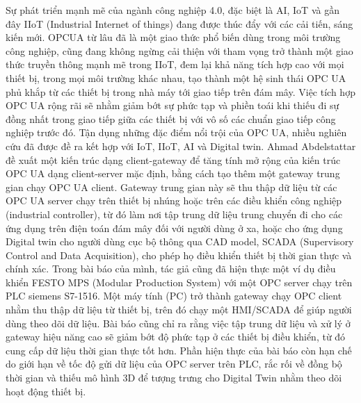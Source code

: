 Sự phát triển mạnh mẽ của ngành công nghiệp 4.0, đặc biệt là AI, IoT và gần đây IIoT (Industrial Internet of things) đang được thúc đẩy với các cải tiến, sáng kiến mới. OPCUA từ lâu đã là một giao thức phổ biến dùng trong môi trường công nghiệp, cũng đang không ngừng cải thiện với tham vọng trở thành một giao thức truyền thông mạnh mẽ trong IIoT, đem lại khả năng tích hợp cao với mọi thiết bị, trong mọi môi trường khác nhau, tạo thành một hệ sinh thái OPC UA phủ khắp từ các thiết bị trong nhà máy tới giao tiếp trên đám mây. Việc tích hợp OPC UA rộng rãi sẽ nhằm giảm bớt sự phức tạp và phiền toái khi thiếu đi sự đồng nhất trong giao tiếp giữa các thiết bị với vô số các chuẩn giao tiếp công nghiệp trước đó. Tận dụng những đặc điểm nổi trội của OPC UA, nhiều nghiên cứu đã được đề ra kết hợp với IoT, IIoT, AI và Digital twin. Ahmad Abdelstattar \cite{abdelsattaropcgateway} đề xuất một kiến trúc dạng client-gateway để tăng tính mở rộng của kiến trúc OPC UA dạng client-server mặc định, bằng cách tạo thêm một gateway trung gian chạy OPC UA client. Gateway trung gian này sẽ thu thập dữ liệu từ các OPC UA server chạy trên thiết bị nhúng hoặc trên các điều khiển công nghiệp (industrial controller), từ đó làm nơi tập trung dữ liệu trung chuyển đi cho các ứng dụng trên điện toán đám mây đối với người dùng ở xa, hoặc cho ứng dụng Digital twin cho người dùng cục bộ thông qua CAD model, SCADA (Supervisory Control and Data Acquisition), cho phép họ điều khiển thiết bị thời gian thực và chính xác. Trong bài báo của mình, tác giả cũng đã hiện thực một ví dụ điều khiển FESTO MPS (Modular Production System) với một OPC server chạy trên PLC siemens S7-1516. Một máy tính (PC) trở thành gateway chạy OPC client nhằm thu thập dữ liệu từ thiết bị, trên đó chạy một HMI/SCADA để giúp người dùng theo dõi dữ liệu. Bài báo cũng chỉ ra rằng việc tập trung dữ liệu và xử lý ở gateway hiệu năng cao sẽ giảm bớt độ phức tạp ở các thiết bị điều khiển, từ đó cung cấp dữ liệu thời gian thực tốt hơn. Phần hiện thực của bài báo còn hạn chế do giới hạn về tốc độ gửi dữ liệu của OPC server trên PLC, rắc rối về đồng bộ thời gian và thiếu mô hình 3D để tượng trưng cho Digital Twin nhằm theo dõi hoạt động thiết bị.

